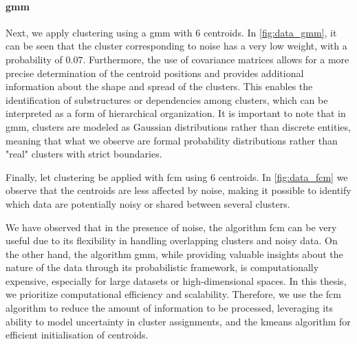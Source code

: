 \begin{modified}
\paragraph{\gls{gmm}} Next, we apply clustering using a \gls{gmm} with $6$ centroids. In \cref{fig:data_gmm}, it can be seen that the cluster corresponding to noise has a very low weight, with a probability of $0.07$. Furthermore, the use of covariance matrices allows for a more precise determination of the centroid positions and provides additional information about the shape and spread of the clusters. This enables the identification of substructures or dependencies among clusters, which can be interpreted as a form of hierarchical organization. It is important to note that in \gls{gmm}, clusters are modeled as Gaussian distributions rather than discrete entities, meaning that what we observe are formal probability distributions rather than "real" clusters with strict boundaries.
\end{modified}

\noindent Finally, let clustering be applied with \gls{fcm} using $6$ centroids. In \cref{fig:data_fcm} we observe that the centroids are less affected by noise, making it possible to identify which data are potentially noisy or shared between several clusters.

\bigskip
\begin{modified}
We have observed that in the presence of noise, the algorithm \gls{fcm} can be very useful due to its flexibility in handling overlapping clusters and noisy data. On the other hand, the algorithm \gls{gmm}, while providing valuable insights about the nature of the data through its probabilistic framework, is computationally expensive, especially for large datasets or high-dimensional spaces. In this thesis, we prioritize computational efficiency and scalability. Therefore, we use the \gls{fcm} algorithm to reduce the amount of information to be processed, leveraging its ability to model uncertainty in cluster assignments, and the \gls{kmeans} algorithm for efficient initialisation of centroids.
\end{modified}
